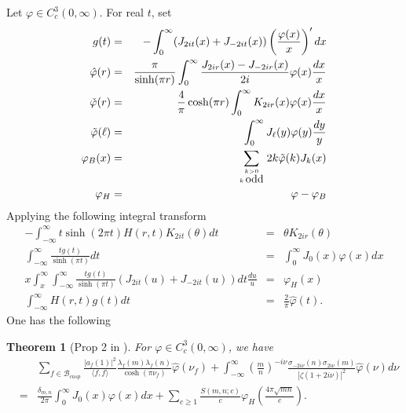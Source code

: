 \documentclass[11pt,reqno]{amsart}
\newcommand{\bna}{\begin{eqnarray*}}
\newcommand{\ena}{\end{eqnarray*}}
\newtheorem{thm}[lemma]{Theorem}
\theoremstyle{definition}
\begin{document}
Let $\varphi\in C_c^3(0,\infty)$.
For real $t$, set
\bna
g(t)&=&-\int_0^\infty(J_{2it}(x)+J_{-2it}(x))\left(\frac{\varphi(x)}{x}\right)'dx\\
\hat\varphi(r)&=&\frac{\pi}{\sinh (\pi r)}\int_{0}^\infty\frac{J_{2ir}(x)-J_{-2ir}(x)}{2i}\varphi(x)\frac{dx}{x}\\
\check{\varphi}(r)&=&\frac{4}{\pi}\cosh(\pi r)\int_0^\infty K_{2ir}(x)\varphi(x)\frac{dx}{x}\\
\tilde\varphi(\ell)&=&\int_0^\infty J_\ell(y)\varphi(y)\frac{dy}{y}\\
\varphi_B(x)&=&\sum_{k>0\atop k\mbox{\,odd}}2k\tilde\varphi(k)J_k(x)\\
\varphi_H&=&\varphi-\varphi_B
\ena
Applying the following integral transform
\bna
-\int_{-\infty}^\infty t\sinh(2\pi t)H(r,t)K_{2it}(\theta)dt
&=&\theta K_{2ir}(\theta)\\
\int_{-\infty}^\infty \frac{tg(t)}{\sinh(\pi t)}dt&=&\int_0^\infty J_0(x)\varphi(x)dx\\
x\int_x^\infty \int_{-\infty}^\infty \frac{tg(t)}{\sinh(\pi t)}(J_{2it}(u)+J_{-2it}(u))dt\frac{du}{u}&=&\varphi_H(x)\\
\int_{-\infty}^\infty H(r,t)g(t)dt&=&\frac{2}{\pi}\hat\varphi(t).
\ena
One has the following
\begin{thm}[Prop 2 in \cite{DeIw1982}]
For $\varphi\in C_c^3(0,\infty)$, we have
\bna
&&\sum_{f\in\mathcal B_{cusp}}\frac{|a_f(1)|^2}{\langle f,f\rangle}
\frac{\lambda_f(m)\lambda_f(n)}{\cosh(\pi\nu_f)}\widehat\varphi(\nu_f)
+\int_{-\infty}^\infty \left(\frac{m}{n}\right)^{-i\nu}\frac{
\sigma_{-2i\nu}(n)\sigma_{2i\nu}(m)
}{|\zeta(1+2i\nu)|^2}\hat\varphi(\nu)d\nu\\
&=&
\frac{\delta_{m,n}}{2\pi}\int_0^\infty J_0(x)\varphi(x)dx
+\sum_{c\geq 1}\frac{S(m,n;c)}{c}\varphi_H\left(\frac{4\pi\sqrt{mn}}{c}\right).
\ena
\end{thm}
\end{document}
